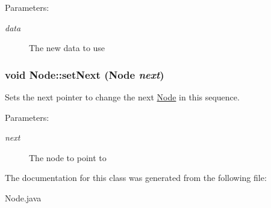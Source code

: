 \begin{Desc}
\item[Parameters:]
\begin{description}
\item[{\em data}]The new data to use \end{description}
\end{Desc}
\hypertarget{class_node_7874ac94fe417848e4c558586e0dbb7a}{
\subsubsection[{setNext}]{\setlength{\rightskip}{0pt plus 5cm}void Node::setNext ({\bf Node} {\em next})}}
\label{class_node_7874ac94fe417848e4c558586e0dbb7a}


Sets the next pointer to change the next \hyperlink{class_node}{Node} in this sequence. 

\begin{Desc}
\item[Parameters:]
\begin{description}
\item[{\em next}]The node to point to \end{description}
\end{Desc}


The documentation for this class was generated from the following file:\begin{CompactItemize}
\item 
Node.java\end{CompactItemize}
